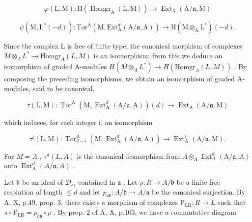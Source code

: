 \[
\varphi (\mathrm{L}, \mathrm{M}): \mathrm{H} (\operatorname{Homgr} _ {\mathrm{A}} (\mathrm{L}, \mathrm{M})) \rightarrow \operatorname{Ext} _ {\mathrm{A}} (\mathrm{A} / \mathfrak {a}, \mathrm{M})
\]

\[
\psi (\mathrm{M}, \mathrm{L} ^ {*} (- d)): \mathrm{Tor} ^ {\mathrm{A}} (\mathrm{M}, \mathrm{Ext} _ {\mathrm{A}} ^ {d} (\mathrm{A} / \mathfrak {a}, \mathrm{A})) \to \mathrm{H} (\mathrm{M} \otimes_ {\mathrm{A}} \mathrm{L} ^ {*}) (- d).
\]

Since the complex L is free of finite type, the canonical morphism of complexes \(M \otimes_{A} L^{*} \to \text{Homgr}_{A}(L, M)\) is an isomorphism; from this we deduce an isomorphism of graded A-modules \(H(M \otimes_{A} L^{*}) \to H(\text{Homgr}_{A}(L, M))\) . By composing the preceding isomorphisms, we obtain an isomorphism of graded A-modules, said to be canonical.

\[
\tau (\mathrm{L}, \mathrm{M}): \operatorname{Tor} ^ {\mathrm{A}} (\mathrm{M}, \operatorname{Ext} _ {\mathrm{A}} ^ {d} (\mathrm{A} / \mathfrak {a}, \mathrm{A})) (d) \longrightarrow \operatorname{Ext} _ {\mathrm{A}} (\mathrm{A} / \mathfrak {a}, \mathrm{M})
\]

which induces, for each integer i, an isomorphism

\[
\tau^ {i} (\mathrm{L}, \mathrm{M}): \operatorname{Tor} _ {d - i} ^ {\mathrm{A}} (\mathrm{M}, \operatorname{Ext} _ {\mathrm{A}} ^ {d} (\mathrm{A} / \mathfrak {a}, \mathrm{A})) \longrightarrow \operatorname{Ext} _ {\mathrm{A}} ^ {i} (\mathrm{A} / \mathfrak {a}, \mathrm{M}).
\]

For \(M = A\) , \(\tau^d(L, A)\) is the canonical isomorphism from \(A \otimes_A \operatorname{Ext}_A^d(\mathrm{A} / \mathfrak{a}, A)\) onto \(\operatorname{Ext}_\mathrm{A}^d(A / \mathfrak{a}, A)\) .

Let \(\mathfrak{b}\) be an ideal of \(\mathcal{D}_{cs}\) contained in \(\mathfrak{a}\) . Let \(\rho: R \to A/\mathfrak{b}\) be a finite free resolution of length \(\leqslant d\) and let \(p_{\mathfrak{ab}}: A/\mathfrak{b} \to A/\mathfrak{a}\) be the canonical surjection. By A, X, p.49, prop. 3, there exists a morphism of complexes \(\mathrm{P}_{\mathrm{LR}}: R \to L\) such that \(\pi \circ \mathrm{P}_{\mathrm{LR}} = p_{\mathfrak{ab}} \circ \rho\) . By prop. 2 of A, X, p.103, we have a commutative diagram


